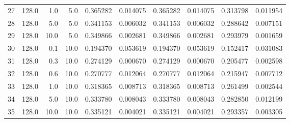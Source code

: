 \begin{tabular}{lrrrrrrrrr}
27 &           128.0 &   1.0 &   5.0 &         0.365282 &        0.014075 &         0.365282 &        0.014075 &         0.313798 &        0.011954 \\
28 &           128.0 &   5.0 &   5.0 &         0.341153 &        0.006032 &         0.341153 &        0.006032 &         0.288642 &        0.007151 \\
29 &           128.0 &  10.0 &   5.0 &         0.349866 &        0.002681 &         0.349866 &        0.002681 &         0.293979 &        0.001659 \\
30 &           128.0 &   0.1 &  10.0 &         0.194370 &        0.053619 &         0.194370 &        0.053619 &         0.152417 &        0.031083 \\
31 &           128.0 &   0.3 &  10.0 &         0.274129 &        0.000670 &         0.274129 &        0.000670 &         0.205477 &        0.002598 \\
32 &           128.0 &   0.6 &  10.0 &         0.270777 &        0.012064 &         0.270777 &        0.012064 &         0.215947 &        0.007712 \\
33 &           128.0 &   1.0 &  10.0 &         0.318365 &        0.008713 &         0.318365 &        0.008713 &         0.261499 &        0.002544 \\
34 &           128.0 &   5.0 &  10.0 &         0.333780 &        0.008043 &         0.333780 &        0.008043 &         0.282850 &        0.012199 \\
35 &           128.0 &  10.0 &  10.0 &         0.335121 &        0.004021 &         0.335121 &        0.004021 &         0.293357 &        0.003305 \\
\bottomrule
\end{tabular}
